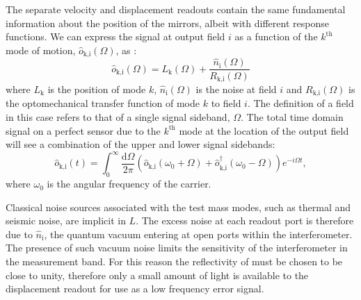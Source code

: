 The separate velocity and displacement readouts contain the same fundamental information about the position of the mirrors, albeit with different response functions. We can express the signal at output field $i$ as a function of the $k^{\textrm{th}}$ mode of motion, $\hat{o}_{\textrm{k,i}} \left( \Omega \right)$, as \cite{Kimble2001}:
\begin{equation}
  \label{eq:readout-signals}
  \hat{o}_{\textrm{k,i}} \left( \Omega \right) = L_{\textrm{k}}\left(\Omega\right) + \frac{\hat{n}_{\textrm{i}} \left( \Omega \right)}{R_{\textrm{k,i}} \left( \Omega \right)}
\end{equation}
where $L_{\textrm{k}}$ is the position of mode $k$, $\hat{n}_{\textrm{i}} \left( \Omega \right)$ is the noise at field $i$ and $R_{\textrm{k,i}} \left( \Omega \right)$ is the optomechanical transfer function of mode $k$ to field $i$. The definition of a field in this case refers to that of a single signal sideband, $\Omega$. The total time domain signal on a perfect sensor due to the $k^{\textrm{th}}$ mode at the location of the output field will see a combination of the upper and lower signal sidebands:
\begin{equation}
  \hat{o}_{\textrm{k,i}} \left( t \right) = \int_{0}^{\infty} \frac{\textrm{d} \Omega}{2 \pi} \left( \hat{o}_{\textrm{k,i}} \left( \omega_{0} + \Omega \right) + \hat{o}_{\textrm{k,i}}^\dag \left( \omega_{0} - \Omega \right) \right) e^{-i \Omega t},
\end{equation}
where $\omega_{0}$ is the angular frequency of the carrier.

Classical noise sources associated with the test mass modes, such as thermal and seismic noise, are implicit in $L$. The excess noise at each readout port is therefore due to $\hat{n}_{\textrm{i}}$, the quantum vacuum entering at open ports within the interferometer. The presence of such vacuum noise limits the sensitivity of the interferometer in the measurement band. For this reason the reflectivity of \MINT{} must be chosen to be close to unity, therefore only a small amount of light is available to the displacement readout for use as a low frequency error signal.

